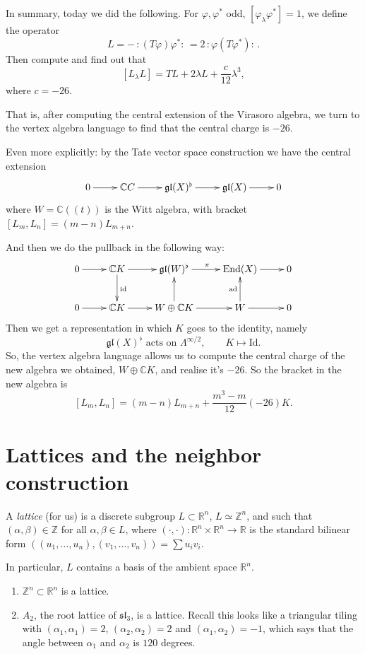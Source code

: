 \medskip\noindent
In summary, today we did the following.
For $\varphi, \varphi^*$ odd,
$[\varphi_\lambda \varphi^*]=1$,
we define the operator
$$
L=-\,:\!(T\varphi)\varphi^*\!:\,=2\,:
\!\varphi(T\varphi^*)\!:\,.
$$
Then compute and find out that
 $$
[L_\lambda L]=TL+2\lambda
L+\frac{c}{12}\lambda^3,
$$
where $c=-26$.

That is, after computing the central
extension
of the Virasoro algebra, we turn to the
vertex algebra language to find that the
central
charge is $-26$.

Even more explicitly: by the Tate vector
space construction
we have the central extension
$$
\xymatrix{
0\ar[r]&\mathbb{C}C\ar[r]&\mathfrak{gl}(X)
^\flat\ar[r]&\mathfrak{gl}(X)\ar[r]&0
}
$$
where $W=\mathbb{C}((t))$ is the Witt
algebra,
with bracket $[L_m,L_n]=(m-n)L_{m+n}$.

And then we do the pullback in the following
way:
$$
\xymatrix{
0\ar[r]&\mathbb{C}K\ar[d]^{\text{id}}\ar[r]
&\mathfrak{gl}(W)^\flat\ar[r]^\pi
&\text{End}(X)\ar[r]&0\\
0\ar[r]&\mathbb{C}K\ar[r]&W \oplus \mathbb{C}
K\ar[u]\ar[r]
& W\ar[u]^{\text{ad}}\ar[r]&0
}
$$
Then we get a representation in which $K$
goes to the identity,
namely
$$
\mathfrak{gl}(X)^\flat \text{ acts on }
\Lambda^{\infty/2},
\qquad K \mapsto \text{Id}.
$$
So, the vertex algebra language allows us to
compute
the central charge of the new algebra we
obtained,
$W \oplus \mathbb{C}K$,
and realise it's $-26$. So the bracket in the
new algebra is
 $$
[L_m,L_n]=(m-n)L_{m+n}+\frac{m^3-m}{12}(-26)
K.
$$

\section{Lattices and the neighbor
construction}
\label{section-lattices}

\begin{definition}
\label{definition-lattice}
A {\it lattice} (for us) is a discrete
subgroup $L \subset \mathbb{R}^n$,
$L \simeq \mathbb{Z}^n$, and such that
$(\alpha,\beta) \in \mathbb{Z}$
for all $\alpha, \beta \in L$,
where $(\cdot,\cdot):\mathbb{R}^n \times
\mathbb{R}^n \to \mathbb{R}$
is the standard bilinear form
$((u_1,\ldots,u_n),(v_1,\ldots,v_n))=\sum
u_iv_i$.
\end{definition}

\noindent
In particular, $L$ contains a basis of the
ambient space $\mathbb{R}^n$.

\begin{example}
\label{example-lattices}
\begin{enumerate}
\item $\mathbb{Z}^n \subset \mathbb{R}^n$ is
a lattice.
\item $A_2$, the root lattice of
$\mathfrak{sl}_3$, is a lattice.
Recall this looks like a triangular tiling
with
$(\alpha_1,\alpha_1)=2$,
$(\alpha_2,\alpha_2)=2$
and $(\alpha_1,\alpha_2)=-1$, which says
that the angle between $\alpha_1$ and
$\alpha_2$ is $120$ degrees.
\end{enumerate}
\end{example}


